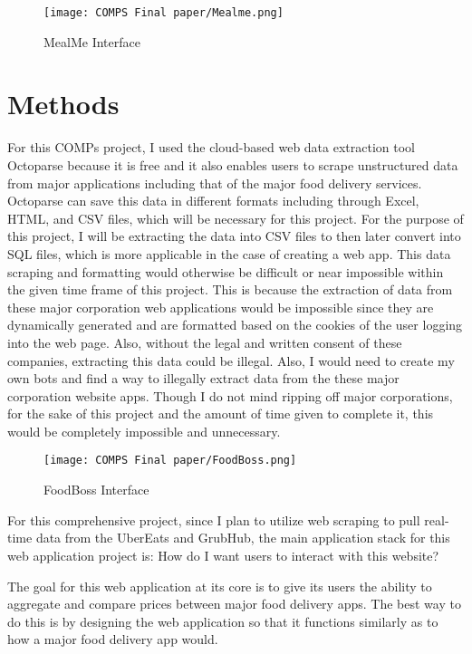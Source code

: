 \documentclass[10pt,twocolumn]{article}
\begin{document}
\begin{figure}
    \centering
    \texttt{[image: COMPS Final paper/Mealme.png]}
    \caption{
        MealMe Interface
    }
    \label{fig:second-page-2}
\end{figure}

\section{Methods}

For this COMPs project, I used the cloud-based web data extraction tool Octoparse because it is free and it also enables users to scrape unstructured data from major applications including that of the major food delivery services. Octoparse can save this data in different formats including through Excel, HTML, and CSV files, which will be necessary for this project. For the purpose of this project, I will be extracting the data into CSV files to then later convert into SQL files, which is more applicable in the case of creating a web app. This data scraping and formatting would otherwise be difficult or near impossible within the given time frame of this project. This is because the extraction of data from these major corporation web applications would be impossible since they are dynamically generated and are formatted based on the cookies of the user logging into the web page. Also, without the legal and written consent of these companies, extracting this data could be illegal. Also, I would need to create my own bots and find a way to illegally extract data from the these major corporation website apps. Though I do not mind ripping off major corporations, for the sake of this project and the amount of time given to complete it, this would be completely impossible and unnecessary.

\begin{figure}
    \centering
    \texttt{[image: COMPS Final paper/FoodBoss.png]}
    \caption{
        FoodBoss Interface
    }
    \label{fig:second-page-3}
\end{figure}

For this comprehensive project, since I plan to utilize web scraping to pull real-time data from the UberEats and GrubHub, the main application stack for this web application project is: How do I want users to interact with this website? 

The goal for this web application at its core is to give its users the ability to aggregate and compare prices between major food delivery apps. The best way to do this is by designing the web application so that it functions similarly as to how a major food delivery app would.
\end{document}
